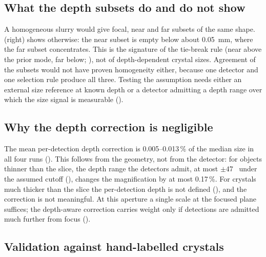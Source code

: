 \subsection{What the depth subsets do and do not show}\label{sec:selfcheck}

A homogeneous slurry would give focal, near and far subsets of the same shape.  (right) shows
otherwise: the near subset is empty below about 0.05~mm, where the far subset concentrates. This is the signature of
the tie-break rule (near above the prior mode, far below; ), not of depth-dependent
crystal sizes. Agreement of the subsets would not have proven homogeneity either, because one detector and one
selection rule produce all three. Testing the assumption needs either an external size reference at known depth or
a detector admitting a depth range over which the size signal is measurable ().

\subsection{Why the depth correction is negligible}\label{sec:depthsmall}

The mean per-detection depth correction is 0.005--0.013\,\% of the median size in all four runs
(). This follows from the geometry, not from the detector: for objects thinner than the slice, the depth range the
detectors admit, at most $\pm 47$~\um{} under the assumed cutoff (), changes the
magnification by at most 0.17\,\%. For crystals much thicker than the slice the per-detection depth is not defined
(), and the correction is not meaningful. At this aperture a single scale at the focused plane
suffices; the depth-aware
correction carries weight only if detections are admitted much further from focus ().

\subsection{Validation against hand-labelled crystals}\label{sec:validation}

